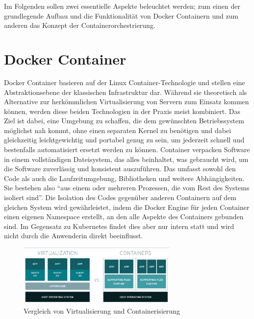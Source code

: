 Im Folgenden sollen zwei essentielle Aspekte beleuchtet werden; zum einen der grundlegende Aufbau und die Funktionalit\"at von Docker Containern und zum anderen das Konzept der Containerorchestrierung.

\section{Docker Container}

Docker Container basieren auf der Linux Container-Technologie und stellen eine Abstraktionsebene der klassischen Infrastruktur dar. 
W\"ahrend sie theoretisch als Alternative zur herkömmlichen Virtualisierung von Servern zum Einsatz kommen k\"onnen, werden diese beiden Technologien in der Praxis meist kombiniert. 
Das Ziel ist dabei, eine Umgebung zu schaffen, die dem gewünschten Betriebssystem möglichst nah kommt, ohne einen separaten Kernel zu benötigen\cite{quan_connecting_2016} und dabei gleichzeitig leichtgewichtig und portabel genug zu sein, um jederzeit schnell und bestenfalls automatisiert ersetzt werden zu k\"onnen. 
Container verpacken Software in einem vollständigen Dateisystem, das alles beinhaltet, was gebraucht wird, um die Software zuverlässig und konsistent  auszuführen. 
Das umfasst sowohl den Code als auch die Laufzeitumgebung, Bibliotheken und weitere Abhängigkeiten.\cite{nguyen_distributed_2017}
Sie bestehen also ``aus einem oder mehreren Prozessen, die vom Rest des Systems isoliert sind''.\cite{red_hat_was_2023}
Die Isolation des Codes gegen\"uber anderen Containern auf dem gleichen System wird gew\"ahrleistet, indem die Docker Engine f\"ur jeden Container einen eigenen Namespace erstellt, an den alle Aspekte des Containers gebunden sind.\cite{DockerInc}
Im Gegensatz zu Kubernetes findet dies aber nur intern statt und wird nicht durch die Anwenderin direkt beeinflusst. 

\begin{figure}[h]
    \centering
    \includegraphics[width=0.7\textwidth]{figures/virtualization-vs-containers.jpeg}
    \caption{Vergleich von Virtualisierung und Containerisierung\cite{red_hat_was_2023}}
    \label{fig:virtualization-comparison}
\end{figure}

